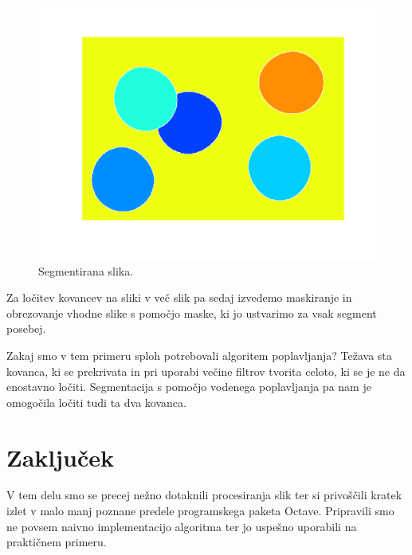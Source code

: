 \documentclass[a4paper, 11pt]{article}
\begin{document}
\begin{figure}[htb]
  \centering
  \includegraphics[width=.5\textwidth]{coins-watershed}
  \caption{Segmentirana slika.}
  \label{img:coins-watershed}
\end{figure}

Za ločitev kovancev na sliki v več slik pa sedaj izvedemo maskiranje in obrezovanje vhodne slike s pomočjo maske, ki jo ustvarimo za vsak segment posebej.

Zakaj smo v tem primeru sploh potrebovali algoritem poplavljanja? Težava sta kovanca, ki se prekrivata in pri uporabi večine filtrov tvorita celoto, ki se je ne da enostavno ločiti. Segmentacija s pomočjo vodenega poplavljanja pa nam je omogočila ločiti tudi ta dva kovanca.


\section{Zaključek}

V tem delu smo se precej nežno dotaknili procesiranja slik ter si privoščili kratek izlet v malo manj poznane predele programskega paketa Octave. Pripravili smo ne povsem naivno implementacijo algoritma ter jo uspešno uporabili na praktičnem primeru.
\end{document}
